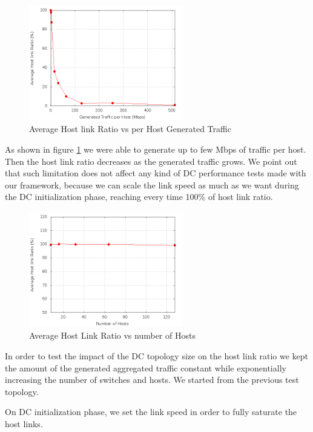 \documentclass[12pt,english,oneside]{book}
\begin{document}
\begin{figure}[h!tbp]
        \centering
        \includegraphics[width=0.6\textwidth]{figures/bw_utilization.png}
        \caption{Average Host link Ratio vs per Host Generated Traffic}
        \label{fig:bw}
\end{figure}

As shown in figure \ref{fig:bw} we were able to generate up to few Mbps of traffic per host.
Then the host link ratio decreases as the generated traffic grows.
We point out that such limitation does not affect any kind of DC performance tests made with our framework,
because we can scale the link speed as much as we want during the DC initialization phase, reaching every time 100\% of host link ratio.

\begin{figure}[h!tbp]
        \centering
        \includegraphics[width=0.6\textwidth]{figures/topo.png}
        \caption{Average Host Link Ratio vs number of Hosts}
        \label{fig:topo}
\end{figure}

In order to test the impact of the DC topology size on the
host link ratio we kept the amount of the generated aggregated traffic 
constant while exponentially increasing the number of switches and hosts.
We started from the previous test topology.

On DC initialization phase, we set the link speed in order to fully saturate the host links.
\end{document}
